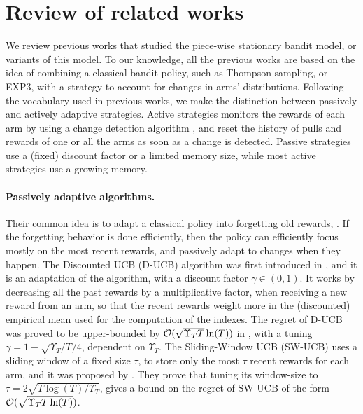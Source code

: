 \section{Review of related works}
\label{sec:6:relatedWork}

We review previous works that studied the piece-wise stationary bandit model, or variants of this model.
To our knowledge, all the previous works are based on the idea of combining a classical bandit policy, such as Thompson sampling, \UCB{} or EXP3, with a strategy to account for changes in arms' distributions.
Following the vocabulary used in previous works, we make the distinction between passively and actively adaptive strategies.
Active strategies monitors the rewards of each arm by using a change detection algorithm \cite{Basseville93}, and reset the history of pulls and rewards of one or all the arms as soon as a change is detected.
Passive strategies use a (fixed) discount factor or a limited memory size, while most active strategies use a growing memory.


\paragraph{Passively adaptive algorithms.}
%
Their common idea is to adapt a classical policy into forgetting old rewards, .
If the forgetting behavior is done efficiently, then the policy can efficiently focus mostly on the most recent rewards, and passively adapt to changes when they happen.
%
The Discounted UCB (D-UCB) algorithm was first introduced in \cite{Kocsis06}, and it is an adaptation of the \UCB{} algorithm, with a discount factor $\gamma\in(0,1)$. It works by decreasing all the past rewards by a multiplicative factor, when receiving a new reward from an arm, so that the recent rewards weight more in the (discounted) empirical mean used for the computation of the \UCB{} indexes.
The regret of D-UCB was proved to be upper-bounded by $\mathcal{O}(\sqrt{\Upsilon_T T }\ln(T))$ in \cite{Garivier11UCBDiscount}, with a tuning $\gamma = 1 - \sqrt{\Upsilon_T/T}/4$, dependent on $\Upsilon_T$.
%
The Sliding-Window UCB (SW-UCB) uses a sliding window of a fixed size $\tau$, to store only the most $\tau$ recent rewards for each arm,
and it was proposed by \cite{Garivier11UCBDiscount}.
They prove that tuning its window-size to $\tau = 2 \sqrt{T\log(T)/\Upsilon_T}$, gives a bound on the regret of SW-UCB of the form $\mathcal{O}(\sqrt{\Upsilon_T T \ln(T)})$.

